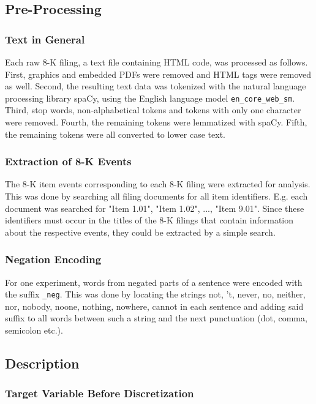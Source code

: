 \documentclass{article}
\begin{document}
	\subsection{Pre-Processing}
	
	\subsubsection{Text in General}
	
	Each raw 8-K filing, a text file containing HTML code, was processed as follows. First, graphics and embedded PDFs were removed and HTML tags were removed as well. Second, the resulting text data was tokenized with the natural language processing library spaCy, using the English language model \lstinline{en_core_web_sm}. Third, stop words, non-alphabetical tokens and tokens with only one character were removed. Fourth, the remaining tokens were lemmatized with spaCy. Fifth, the remaining tokens were all converted to lower case text.
	
	\subsubsection{Extraction of 8-K Events}
	
	The 8-K item events corresponding to each 8-K filing were extracted for analysis. This was done by searching all filing documents for all item identifiers. E.g. each document was searched for "Item 1.01", "Item 1.02", ..., "Item 9.01". Since these identifiers must occur in the titles of the 8-K filings that contain information about the respective events, they could be extracted by a simple search. 
	
	\subsubsection{Negation Encoding}
	
	For one experiment, words from negated parts of a sentence were encoded with the suffix \lstinline{_neg}. This was done by locating the strings not, 't, never, no, neither, nor, nobody, noone, nothing, nowhere, cannot in each sentence and adding said suffix to all words between such a string and the next punctuation (dot, comma, semicolon etc.). 
	

	\subsection{Description}
	
	
	\subsubsection{Target Variable Before Discretization}
	
\end{document}
